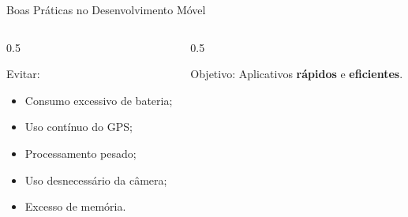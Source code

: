 \documentclass[aspectratio=169]{beamer}
\begin{document}
\begin{frame}{Boas Práticas no Desenvolvimento Móvel}
    \begin{columns}[T]
        \begin{column}{0.5\textwidth}
            \begin{alertblock}{Evitar:}
                \begin{itemize}
                    \item Consumo excessivo de bateria;
                    \item Uso contínuo do GPS;
                    \item Processamento pesado;
                    \item Uso desnecessário da câmera;
                    \item Excesso de memória.
                \end{itemize}
            \end{alertblock}
        \end{column}
        \begin{column}{0.5\textwidth}
            \begin{block}{Objetivo:}
                Aplicativos \textbf{rápidos} e \textbf{eficientes}.
            \end{block}
        \end{column}
    \end{columns}
\end{frame}
\end{document}
